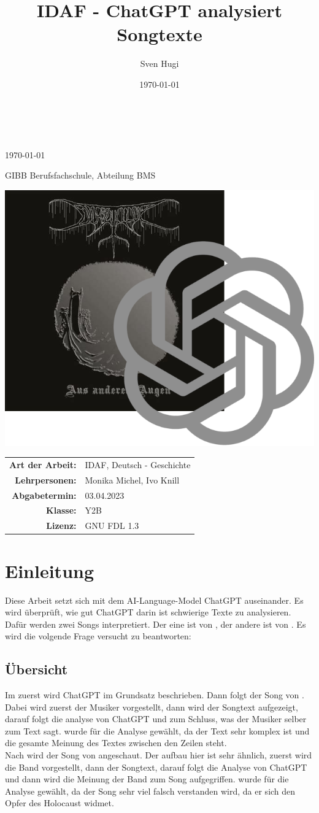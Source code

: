 \documentclass[twocolumn,10pt]{article}
\author{Sven Hugi}
\title{IDAF - ChatGPT analysiert Songtexte}
\date{\today}
\makeatletter
\renewcommand{\maketitle}{
	\begin{center}

		\vspace*{.125\textheight}
		{\Huge \textbf{\@title}\\}
		{\LARGE \textbf{\@author}\\}
		{\large \today\\}
		{\Large GIBB Berufsfachschule, Abteilung BMS\par\vspace*{1cm}}
		\includegraphics[width=\linewidth]{title.png}
		\vfill
		\begin{center}
			\begin{tabularx}{.4\linewidth}{rl}
				\textbf{Art der Arbeit:}				& IDAF, Deutsch - Geschichte\\
				\textbf{Lehrpersonen:}					& Monika Michel, Ivo Knill\\
				\textbf{Abgabetermin:}					& 03.04.2023\\
				\textbf{Klasse:}						& Y2B	\\
				\textbf{Lizenz:}						& GNU FDL 1.3
			\end{tabularx}
		\end{center}
		
	\end{center}
}
\makeatother
\begin{document}
	\begin{titlepage}
		\maketitle
		\thispagestyle{empty}
	\end{titlepage}
	\onecolumn
	\pagestyle{fancy}
	\tableofcontents
	\clearpage
	\twocolumn
	
	\section{Einleitung}
		Diese Arbeit setzt sich mit dem AI-Language-Model ChatGPT\cite{ChatGPT} auseinander. Es wird überprüft, wie gut ChatGPT darin ist schwierige Texte zu analysieren. Dafür werden zwei Songs interpretiert. Der eine ist  von , der andere ist  von . Es wird die volgende Frage versucht zu beantworten:\\
		\textbf{}
		\subsection{Übersicht}
		Im zuerst wird ChatGPT\cite{ChatGPT} im Grundsatz beschrieben. Dann folgt der Song  von . Dabei wird zuerst der Musiker vorgestellt, dann wird der Songtext aufgezeigt, darauf folgt die analyse von ChatGPT und zum Schluss, was der Musiker selber zum Text sagt.  wurde für die Analyse gewählt, da der Text sehr komplex ist und die gesamte Meinung des Textes zwischen den Zeilen steht.\\
		Nach  wird der Song  von  angeschaut. Der aufbau hier ist sehr ähnlich, zuerst wird die Band vorgestellt, dann der Songtext, darauf folgt die Analyse von ChatGPT und dann wird die Meinung der Band zum Song aufgegriffen.  wurde für die Analyse gewählt, da der Song sehr viel falsch verstanden wird, da er sich den Opfer des Holocaust widmet.
		\vfill
		\pagebreak
\end{document}
